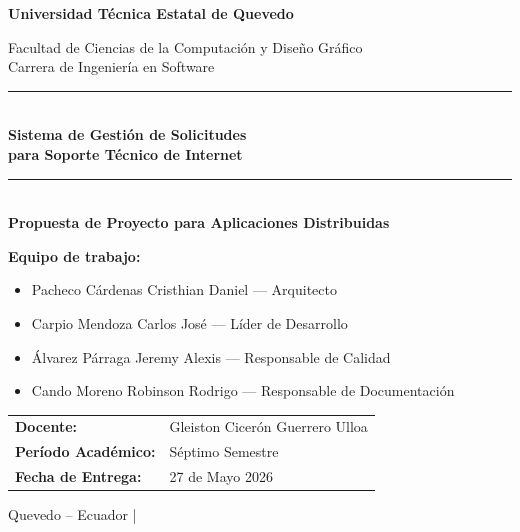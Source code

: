 \documentclass[12pt, a4paper]{article}
\begin{document}
\begin{titlepage}
    \centering
    \vspace*{0.5cm}

    {\Large\bfseries
        Universidad Técnica Estatal de Quevedo\\[0.4cm]}

    {\normalsize Facultad de Ciencias de la Computación y Diseño Gráfico\\[0.1cm]
     Carrera de Ingeniería en Software\\[2cm]}

    \rule{\linewidth}{1.5pt}\\[0.4cm]
    {\LARGE\bfseries
        Sistema de Gestión de Solicitudes\\[0.2cm]
        para Soporte Técnico de Internet}\\[0.4cm]
    \rule{\linewidth}{1.5pt}\\[1.5cm]

    {\large\bfseries Propuesta de Proyecto para Aplicaciones Distribuidas\\[2cm]}

    \begin{flushleft}
        \textbf{Equipo de trabajo:}\\[0.4cm]
        \hspace{1cm}
        \begin{minipage}{0.85\textwidth}
            \begin{itemize}
                \setlength{\itemsep}{0.3cm}
                \item Pacheco Cárdenas Cristhian Daniel \quad --- \quad Arquitecto
                \item Carpio Mendoza Carlos José \quad --- \quad Líder de Desarrollo
                \item Álvarez Párraga Jeremy Alexis \quad --- \quad Responsable de Calidad
                \item Cando Moreno Robinson Rodrigo \quad --- \quad Responsable de Documentación
            \end{itemize}
        \end{minipage}
    \end{flushleft}

    \vspace{1.5cm}

    \begin{flushleft}
        \hspace{1cm}
        \begin{tabular}{ll}
            \textbf{Docente:} & Gleiston Cicerón Guerrero Ulloa \\[0.3cm]
            \textbf{Período Académico:} & Séptimo Semestre \\[0.3cm]
            \textbf{Fecha de Entrega:} & 27 de Mayo 2026 \\
        \end{tabular}
    \end{flushleft}

    \vfill
    {\small Quevedo -- Ecuador \quad | }
\end{titlepage}
\end{document}
